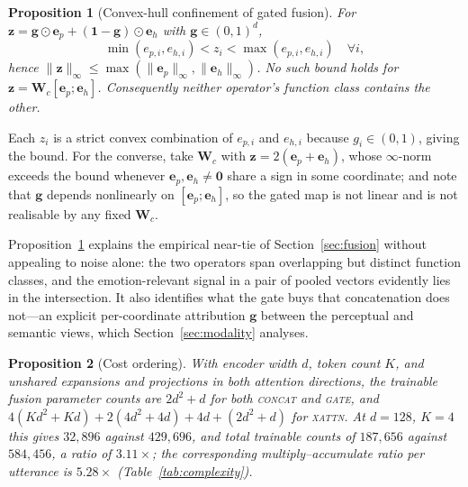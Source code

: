 \documentclass[journal,onecolumn,11pt,draftclsnofoot]{IEEEtran}   %
\newtheorem{proposition}{Proposition}
\begin{document}
\begin{proposition}[Convex-hull confinement of gated fusion]
\label{prop:hull}
For $\mathbf{z} = \mathbf{g}\odot\mathbf{e}_p + (\mathbf{1}-\mathbf{g})
\odot\mathbf{e}_h$ with $\mathbf{g} \in (0,1)^d$,
\begin{equation}
  \min(e_{p,i}, e_{h,i}) < z_i < \max(e_{p,i}, e_{h,i}) \quad \forall i,
\end{equation}
hence $\|\mathbf{z}\|_\infty \leq \max(\|\mathbf{e}_p\|_\infty,
\|\mathbf{e}_h\|_\infty)$. No such bound holds for
$\mathbf{z} = \mathbf{W}_c[\mathbf{e}_p;\mathbf{e}_h]$. Consequently neither
operator's function class contains the other.
\end{proposition}
\begin{IEEEproof}
Each $z_i$ is a strict convex combination of $e_{p,i}$ and $e_{h,i}$ because
$g_i \in (0,1)$, giving the bound. For the converse, take $\mathbf{W}_c$ with
$\mathbf{z} = 2(\mathbf{e}_p + \mathbf{e}_h)$, whose $\infty$-norm exceeds the
bound whenever $\mathbf{e}_p,\mathbf{e}_h \neq \mathbf{0}$ share a sign in some
coordinate; and note that $\mathbf{g}$ depends nonlinearly on
$[\mathbf{e}_p;\mathbf{e}_h]$, so the gated map is not linear and is not
realisable by any fixed $\mathbf{W}_c$.
\end{IEEEproof}

Proposition~\ref{prop:hull} explains the empirical near-tie of
Section~\ref{sec:fusion} without appealing to noise alone: the two operators
span overlapping but distinct function classes, and the emotion-relevant signal
in a pair of pooled vectors evidently lies in the intersection. It also
identifies what the gate buys that concatenation does not---an explicit
per-coordinate attribution $\mathbf{g}$ between the perceptual and semantic
views, which Section~\ref{sec:modality} analyses.

\begin{proposition}[Cost ordering]
\label{prop:cost}
With encoder width $d$, token count $K$, and unshared expansions and
projections in both attention directions, the trainable fusion parameter counts
are $2d^2 + d$ for both \textsc{concat} and \textsc{gate}, and
$4(Kd^2 + Kd) + 2(4d^2+4d) + 4d + (2d^2+d)$ for \textsc{xattn}. At $d = 128$,
$K = 4$ this gives $32{,}896$ against $429{,}696$, and total trainable counts of
$187{,}656$ against $584{,}456$, a ratio of $3.11\times$; the corresponding
multiply--accumulate ratio per utterance is $5.28\times$
(Table~\ref{tab:complexity}).
\end{proposition}
\end{document}
